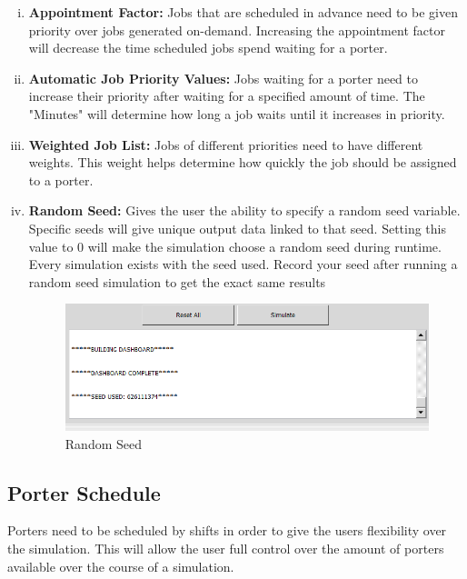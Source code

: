 \documentclass[paper=letter, fontsize=10pt]{scrartcl}
\numberwithin{equation}{section}		%
\numberwithin{figure}{section}			%
\numberwithin{table}{section}				%
\begin{document}
	\begin{enumerate}[(i)]
		\item \textbf{Appointment Factor:} Jobs that are scheduled in advance need to be given priority over jobs generated on-demand.  Increasing the appointment factor will decrease the time scheduled jobs spend waiting for a porter.
		\item \textbf{Automatic Job Priority Values:} Jobs waiting for a porter need to increase their priority after waiting for a specified amount of time.  The "Minutes" will determine how long a job waits until it increases in priority.
		\item \textbf{Weighted Job List:} Jobs of different priorities need to have different weights.  This weight helps determine how quickly the job should be assigned to a porter.
		\item \textbf{Random Seed:} Gives the user the ability to specify a random seed variable. Specific seeds will give unique output data linked to that seed. Setting this value to 0 will make the simulation choose a random seed during runtime. Every simulation exists with the seed used. Record your seed after running a random seed simulation to get the exact same results
		\begin{figure}[!htbp]		
		\begin{center}
			\includegraphics[width=1\columnwidth, height=0.45\textheight, keepaspectratio]{randomSeed.png}
			\caption{Random Seed}
		\end{center}
		\end{figure} 
	\end{enumerate}
	
	\subsection{Porter Schedule}
	Porters need to be scheduled by shifts in order to give the users flexibility over the simulation.  This will allow the user full control over the amount of porters available over the course of a simulation.
	
\end{document}

